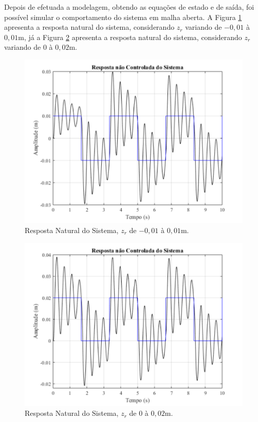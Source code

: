\documentclass[journal,brazil,english]{IEEEtran}
\begin{document}
Depois de  efetuada a modelagem, obtendo as equações de estado e de saída, foi possível simular o comportamento do sistema em malha aberta. A Figura \ref{malhaabertaEE} apresenta a resposta natural do sistema, considerando $z_r$ variando de $-0,01$ à $0,01$m, já a Figura \ref{malhaabertaEE2} apresenta a resposta natural do sistema, considerando $z_r$ variando de $0$ à $0,02$m.

\begin{figure}[H]
	\centering
\includegraphics[width=\columnwidth]{./imagens/resposta_natural_sistema.pdf}
	\renewcommand{\figurename}{Fig.}
    \caption{Resposta Natural do Sistema, $z_r$ de $-0,01$ à $0,01$m.}
	\label{malhaabertaEE}
\end{figure}

\begin{figure}[H]
	\centering
\includegraphics[width=\columnwidth]{./imagens/resposta_natural_sistema2.pdf}
    \renewcommand{\figurename}{Fig.}
    \caption{Resposta Natural do Sistema, $z_r$ de $0$ à $0,02$m.}
	\label{malhaabertaEE2}
\end{figure}
\end{document}
